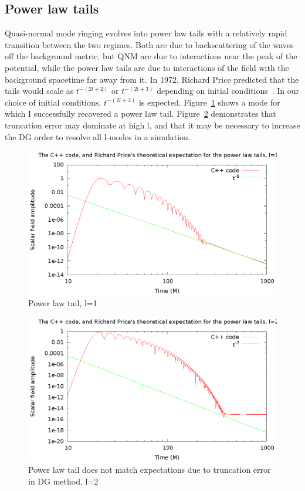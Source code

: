 \subsection{Power law tails}

Quasi-normal mode ringing evolves into power law tails with a relatively rapid transition between the two regimes. Both are due to backscattering of the waves off the background metric, but QNM are due to interactions near the peak of the potential, while the power law tails are due to interactions of the field with the background spacetime far away from it. In 1972, Richard Price predicted that the tails would scale as $t^{-(2l+2)}$ or $t^{-(2l+3)}$ depending on initial conditions~\cite{PriceTails}. In our choice of initial conditions, $t^{-(2l+3)}$ is expected. Figure~\ref{taill1m1} shows a mode for which I successfully recovered a power law tail. Figure~\ref{notaill2m2} demonstrates that truncation error may dominate at high l, and that it may be necessary to increase the DG order to resolve all l-modes in a simulation.

\begin{figure}
  \includegraphics{l1m1tail2}
  \caption{Power law tail, l=1}
  \label{taill1m1}
\end{figure}

\begin{figure}
  \includegraphics{l2m2tailfail2}
  \caption{Power law tail does not match expectations due to truncation error in DG method, l=2}
  \label{notaill2m2}
\end{figure}

